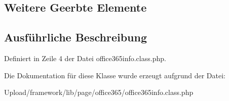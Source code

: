 \subsection*{Weitere Geerbte Elemente}


\subsection{Ausführliche Beschreibung}


Definiert in Zeile 4 der Datei office365info.\+class.\+php.



Die Dokumentation für diese Klasse wurde erzeugt aufgrund der Datei\+:\begin{DoxyCompactItemize}
\item 
Upload/framework/lib/page/office365/office365info.\+class.\+php\end{DoxyCompactItemize}
